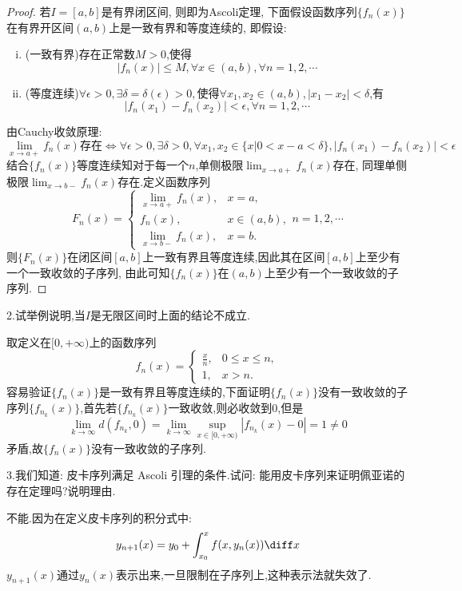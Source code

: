\begin{proof}
若$I=[a,b]$是有界闭区间, 则即为Ascoli定理, 下面假设函数序列$\{f_n(x)\}$在有界开区间$(a,b)$上是一致有界和等度连续的, 即假设:
\begin{enumerate}[(i)]
\item (一致有界)存在正常数$M>0$,使得
\[|f_n(x)|\leq M,\forall x\in(a,b),\forall n=1,2,\cdots\]
\item (等度连续)$\forall\epsilon>0,\exists\delta=\delta(\epsilon)>0,$使得$\forall x_1,x_2\in(a,b),|x_1-x_2|<\delta$,有
\[|f_n(x_1)-f_n(x_2)|<\epsilon,\forall n=1,2,\cdots\]
\end{enumerate}
由Cauchy收敛原理:
\[\lim_{x\to a+}f_n(x)存在\Leftrightarrow\forall\epsilon>0,\exists\delta>0,\forall x_1,x_2\in\{x|0<x-a<\delta\},|f_n(x_1)-f_n(x_2)|<\epsilon\]
结合$\{f_n(x)\}$等度连续知对于每一个$n$,单侧极限$\displaystyle\lim_{x\to a+}f_n(x)$存在, 
同理单侧极限$\displaystyle\lim_{x\to b-}f_n(x)$存在.定义函数序列
\[F_n(x)=\begin{cases}
\lim\limits_{x\to a+}f_n(x),&x=a,\\
f_n(x),&x\in (a,b),\\
\lim\limits_{x\to b-}f_n(x),&x=b.
\end{cases}n=1,2,\cdots\]
则$\{F_n(x)\}$在闭区间$[a,b]$上一致有界且等度连续,因此其在区间$[a,b]$上至少有一个一致收敛的子序列,
由此可知$\{f_n(x)\}$在$(a,b)$上至少有一个一致收敛的子序列.
\end{proof}


2.试举例说明,当$I$是无限区间时上面的结论不成立.

\begin{solve}
取定义在$[0,+\infty)$上的函数序列
\[f_n(x)=\begin{cases}
\frac{x}{n},&0\leq x\leq n,\\
1,&x>n.
\end{cases}\]
容易验证$\{f_n(x)\}$是一致有界且等度连续的,下面证明$\{f_n(x)\}$没有一致收敛的子序列$\{f_{n_k}(x)\}$,首先若$\{f_{n_k}(x)\}$一致收敛,则必收敛到0,但是
\[\lim_{k\to\infty}d(f_{n_k},0)=\lim_{k\to\infty}\sup_{x\in[0,+\infty)}|f_{n_k}(x)-0|=1\neq0\]
矛盾,故$\{f_n(x)\}$没有一致收敛的子序列.
\end{solve}


3.我们知道: 皮卡序列满足 Ascoli 引理的条件.试问: 能用皮卡序列来证明佩亚诺的存在定理吗?说明理由.

\begin{solve}
不能.因为在定义皮卡序列的积分式中:
\[y_{n+1}(x)=y_0+\int_{x_0}^xf(x,y_n(x))\diff x\]
$y_{n+1}(x)$通过$y_n(x)$表示出来,一旦限制在子序列上,这种表示法就失效了.
\end{solve}


